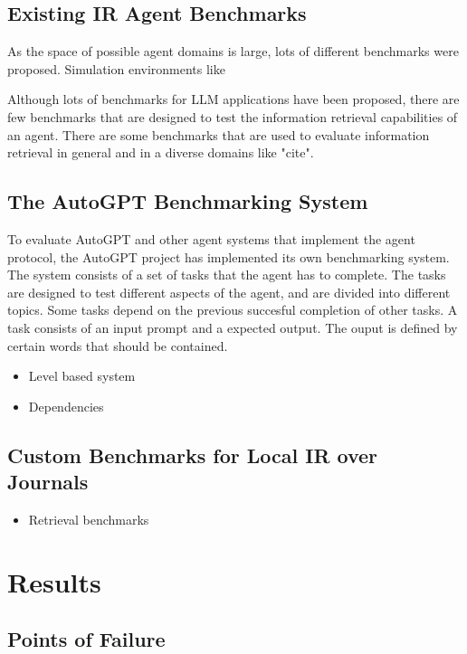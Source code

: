\documentclass[english, version-2022-01]{uzl-thesis}
\begin{document}
\section{Existing IR Agent Benchmarks}

As the space of possible agent domains is large, lots of different benchmarks were proposed. Simulation environments like

Although lots of benchmarks for LLM applications have been proposed, there are few benchmarks that are designed to test the information retrieval capabilities of an agent.
There are some benchmarks that are used to evaluate information retrieval in general and in a diverse domains like "cite".

\section{The AutoGPT Benchmarking System}

To evaluate AutoGPT and other agent systems that implement the agent protocol, the AutoGPT project has implemented its own benchmarking system.
The system consists of a set of tasks that the agent has to complete. The tasks are designed to test different aspects of the agent, and are divided into different topics.
Some tasks depend on the previous succesful completion of other tasks. A task consists of an input prompt and a expected output.
The ouput is defined by certain words that should be contained.

\begin{itemize}
	\item Level based system
	\item Dependencies
\end{itemize}

\section{Custom Benchmarks for Local IR over Journals}

\begin{itemize}
	\item Retrieval benchmarks
\end{itemize}

\chapter{Results}

\section{Points of Failure}
\end{document}
